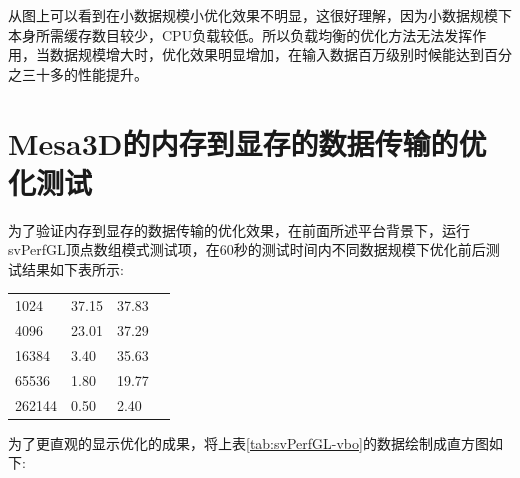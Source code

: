 从图上可以看到在小数据规模小优化效果不明显，这很好理解，因为小数据规模下本身所需缓存数目较少，CPU负载较低。所以负载均衡的优化方法无法发挥作用，当数据规模增大时，优化效果明显增加，在输入数据百万级别时候能达到百分之三十多的性能提升。

\section{Mesa3D的内存到显存的数据传输的优化测试}

为了验证内存到显存的数据传输的优化效果，在前面所述平台背景下，运行svPerfGL顶点数组模式测试项，在60秒的测试时间内不同数据规模下优化前后测试结果如下表所示:

\begin{center}  
\tablelasttail{\bottomrule}

\begin{supertabular}{p{4.cm}<{\centering}p{4.cm}<{\centering}p{4.cm}<{\centering}p{3.cm}<{\centering}}
	1024& 37.15& 37.83&	\\
	4096& 23.01& 37.29&	\\
	16384& 3.40& 35.63&	\\
	65536& 1.80& 19.77&	\\
	262144& 0.50& 2.40&	\\
\end{supertabular}
\end{center}

为了更直观的显示优化的成果，将上表\ref{tab:svPerfGL-vbo}的数据绘制成直方图如下:

